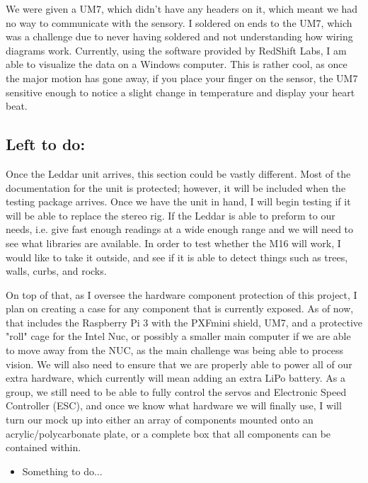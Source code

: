 \documentclass[compsoc,draftclsnofoot,onecolumn,10pt]{IEEEtran}
\begin{document}
		We were given a UM7, which didn't have any headers on it, which meant we had no way to communicate with the sensory. 
		I soldered on ends to the UM7, which was a challenge due to never having soldered and not understanding how wiring diagrams work.
		 Currently, using the software provided by RedShift Labs, I am able to visualize the data on a Windows computer. 
		This is rather cool, as once the major motion has gone away, if you place your finger on the sensor, the UM7 sensitive enough to notice a slight change in temperature and display your heart beat. 
		
		
		
	\subsection{Left to do:}
		Once the Leddar unit arrives, this section could be vastly different. Most of the documentation for the unit is protected; however, it will be included when the testing package arrives. 
		Once we have the unit in hand, I will begin testing if it will be able to replace the stereo rig. 
		If the Leddar is able to preform to our needs, i.e. give fast enough readings at a wide enough range and we will need to see what libraries are available. 
		In order to test whether the M16 will work, I would like to take it outside, and see if it is able to detect things such as trees, walls, curbs, and rocks. 
			
		On top of that, as I oversee the hardware component protection of this project, I plan on creating a case for any component that is currently exposed. 
		As of now, that includes the Raspberry Pi 3 with the PXFmini shield, UM7, and a protective "roll" cage for the Intel Nuc, or possibly a smaller main computer if we are able to move away from the NUC, as the main challenge was being able to process vision. 
		We will also need to ensure that we are properly able to power all of our extra hardware, which currently will mean adding an extra LiPo battery.
		As a group, we still need to be able to fully control the servos and Electronic Speed Controller (ESC), and once we know what hardware we will finally use, I will turn our mock up into either an array of components mounted onto an acrylic/polycarbonate plate, or a complete box that all components can be contained within. 
		\begin{itemize}
			\item Something to do...
		\end{itemize}
\end{document}
